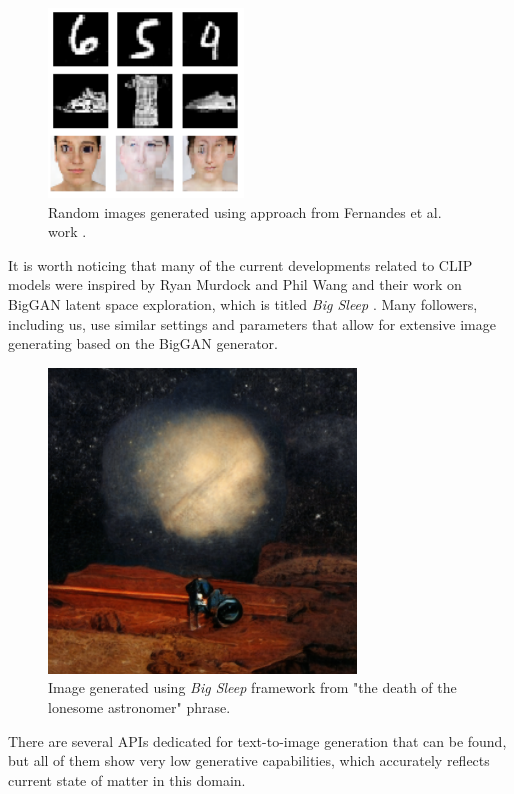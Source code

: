\documentclass[11pt,a4paper,openany]{book}
\begin{document}
\begin{figure}[H]
    \centering
    \includegraphics[scale=1.5]{figs/coimbra.png}
    \caption{Random images generated using approach from Fernandes et al. work \cite{coimbra}.}\label{Fig:coimbra}
\end{figure}

\noindent It is worth noticing that many of the current developments related to CLIP models were inspired by Ryan Murdock and Phil Wang and their work on BigGAN latent space exploration, which is titled \textit{Big Sleep} \cite{bigsleep}. Many followers, including us, use similar settings and parameters that allow for extensive image generating based on the BigGAN generator.


\begin{figure}[H]
    \centering
    \includegraphics[scale=0.6]{figs/bigsleep.png}
    \caption{Image generated using \textit{Big Sleep} \cite{bigsleep} framework from "the death of the lonesome astronomer" phrase.}\label{Fig:BigSleep}
\end{figure}


\noindent There are several APIs dedicated for text-to-image generation that can be found, but all of them show very low generative capabilities, which accurately reflects current state of matter in this domain.
\end{document}
